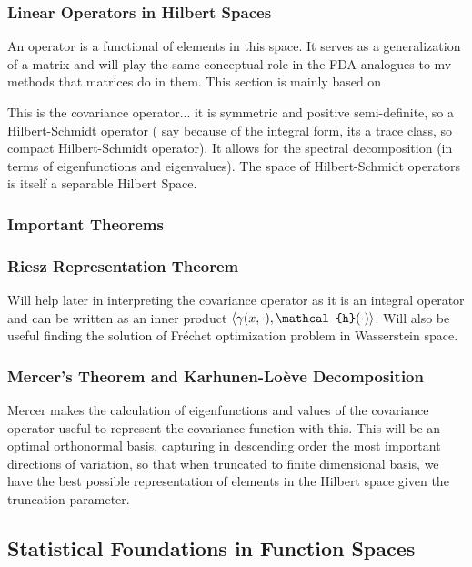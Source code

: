 \subsubsection{Linear Operators in Hilbert Spaces}
\label{sec:operators}

An operator is a functional of elements in this space. It serves as a generalization of
a matrix and will play the same conceptual role in the FDA analogues to mv methods
that matrices do in them. This section is mainly based on \textcite[Chapter~]{HorvathKokoszka2012}

This is the covariance operator... it is symmetric and positive semi-definite, so
a Hilbert-Schmidt operator (\textcite{WangChiouMüller2016} say because of the integral form,
its a trace class, so compact Hilbert-Schmidt operator). It allows for the spectral
decomposition (in terms of eigenfunctions and eigenvalues). The space of Hilbert-Schmidt
operators is itself a separable Hilbert Space.

\subsubsection{Important Theorems}
\label{sec:theorems}

\subsubsection{Riesz Representation Theorem}
\label{sec:riesz}
Will help later in interpreting the covariance operator as it is an integral operator
and can be written as an inner product $\inpr{\gamma(x, \cdot)}{\mathcal{h}(\cdot)}$.
Will also be useful finding the solution of Fréchet optimization problem in Wasserstein
space.

\subsubsection{Mercer's Theorem and Karhunen-Loève Decomposition}
\label{sec:mercer and kh}
Mercer makes the calculation of eigenfunctions and values of the covariance operator
useful to represent the covariance function with this. This will be an optimal orthonormal
basis, capturing in descending order the most important directions of variation, so that
when truncated to finite dimensional basis, we have the best possible representation of
elements in the Hilbert space given the truncation parameter.


\subsection{Statistical Foundations in Function Spaces}
\label{sec:stat_foundations}

